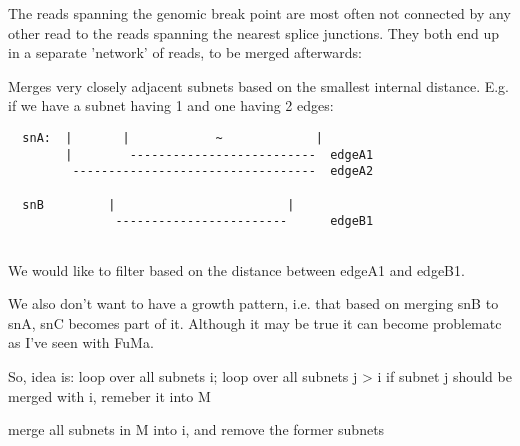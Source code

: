 \documentclass{article}
\theoremstyle{definition}
\begin{document}
The reads spanning the genomic break point are most often not connected by any other read to the reads spanning the nearest splice junctions.
They both end up in a separate 'network' of reads, to be merged afterwards:

Merges very closely adjacent subnets based on the smallest internal distance.
E.g. if we have a subnet having 1 and one having 2 edges:

\begin{verbatim}
  snA:  |       |            ~             |
        |        --------------------------  edgeA1
         ----------------------------------  edgeA2

  snB         |                        |
               ------------------------      edgeB1


\end{verbatim}        

        We would like to filter based on the distance between edgeA1 and
        edgeB1.
        
        We also don't want to have a growth pattern, i.e. that based on
        merging snB to snA, snC becomes part of it. Although it may be
        true it can become problematc as I've seen with FuMa.
        
        So, idea is:
        loop over all subnets i;
            loop over all subnets j > i
                if subnet j should be merged with i, remeber it into M
            
            merge all subnets in M into i, and remove the former subnets
\end{document}
